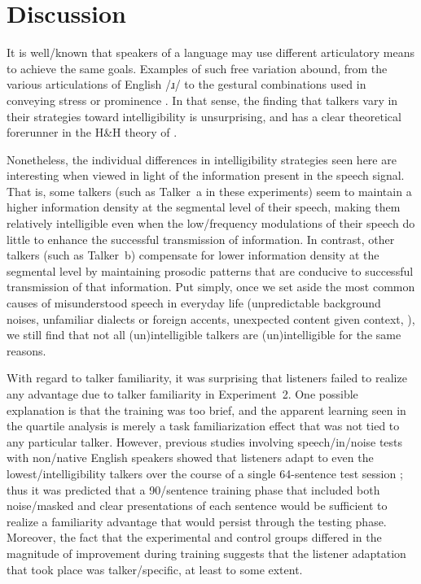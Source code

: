 \chapter{Discussion\label{chap:Discussion}}

It is well\-/known that speakers of a language may use different articulatory means to achieve the same goals.  Examples of such free variation abound, from the various articulations of English /ɹ/ \citep{Hagiwara1995, CampbellEtAl2010} to the gestural combinations used in conveying stress or prominence \citep{deJong1995}.  In that sense, the finding that talkers vary in their strategies toward intelligibility is unsurprising, and has a clear theoretical forerunner in the H\&H theory of \citet{Lindblom1990}.

Nonetheless, the individual differences in intelligibility strategies seen here are interesting when viewed in light of the information present in the speech signal.  That is, some talkers (such as Talker~\ac{a} in these experiments) seem to maintain a higher information density at the segmental level of their speech, making them relatively intelligible even when the low\-/frequency modulations of their speech do little to enhance the successful transmission of information.  In contrast, other talkers (such as Talker~\ac{b}) compensate for lower information density at the segmental level by maintaining prosodic patterns that are conducive to successful transmission of that information.  Put simply, once we set aside the most common causes of misunderstood speech in everyday life (unpredictable background noises, unfamiliar dialects or foreign accents, unexpected content given context, \etc), we still find that not all (un)intelligible talkers are (un)intelligible for the same reasons.

With regard to talker familiarity, it was surprising that listeners failed to realize any advantage due to talker familiarity in Experiment~2.  One possible explanation is that the training was too brief, and the apparent learning seen in the quartile analysis is merely a task familiarization effect that was not tied to any particular talker.  However, previous studies involving speech\-/in\-/noise tests with non\-/native English speakers showed that listeners adapt to even the lowest\-/intelligibility talkers over the course of a single 64-sentence test session \citep{BradlowBent2008}; thus it was predicted that a 90\-/sentence training phase that included both noise\-/masked and clear presentations of each sentence would be sufficient to realize a familiarity advantage that would persist through the testing phase.  Moreover, the fact that the experimental and control groups differed in the magnitude of improvement during training suggests that the listener adaptation that took place was talker\-/specific, at least to some extent.  

